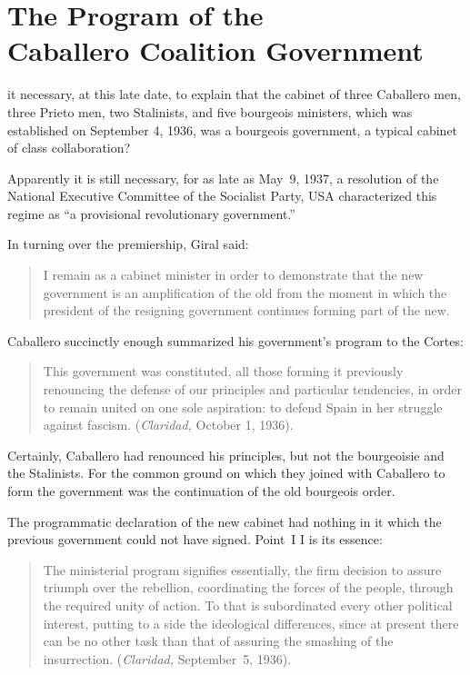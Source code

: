 \chapter[Program of the Caballero Coalition Government]{The Program of the \\ Caballero Coalition Government}

 it necessary, at this late date, to explain that the cabinet of three Caballero men, three Prieto men, two Stalinists, and five bourgeois ministers, which was established on September 4, 1936, was a bourgeois government, a typical cabinet of class collaboration?

Apparently it is still necessary, for as late as May~9, 1937, a resolution of the National Executive Committee of the Socialist Party, USA characterized this regime as ``a provisional revolutionary government.''

\smallskip

In turning over the premiership, Giral said:

\begin{quotation}
  I remain as a cabinet minister in order to demonstrate that the new government is an amplification of the old from the moment in which the president of the resigning government continues forming part of the new.
\end{quotation}

Caballero succinctly enough summarized his government’s program to the Cortes:

\begin{quotation}
  This government was constituted, all those forming it previously renouncing the defense of our principles and particular tendencies, in order to remain united on one sole aspiration: to defend Spain in her struggle against fascism. (\emph{Claridad,} October 1, 1936).
\end{quotation}

Certainly, Caballero had renounced his principles, but not the bourgeoisie and the Stalinists. For the common ground on which they joined with Caballero to form the government was the continuation of the old bourgeois order.

The programmatic declaration of the new cabinet had nothing in it which the previous government could not have signed. Point~I\kern -1pt I is its essence:

\begin{quotation}
  The ministerial program signifies essentially, the firm decision to assure triumph over the rebellion, coordinating the forces of the people, through the required unity of action. To that is subordinated every other political interest, putting to a side the ideological differences, since at present there can be no other task than that of assuring the smashing of the insurrection. (\emph{Claridad,} September~5, 1936).
\end{quotation}

